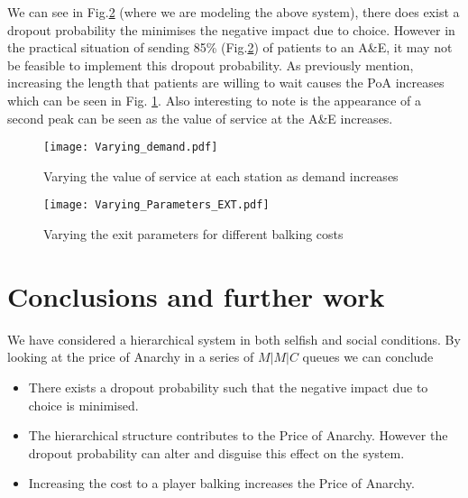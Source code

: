 \documentclass[12pt]{article}
\begin{document}
    We can see in Fig.\ref{fig:EXTparam} (where we are modeling the above system), there does exist a dropout probability the minimises the negative impact due to choice. However in the practical situation of sending 85\% (Fig.\ref{fig:EXTparam}) of patients to an A\&E, it may not be feasible to implement this dropout probability.
   As previously mention, increasing the length that patients are willing to wait causes the PoA increases
 which can be seen in Fig. \ref{fig:Demandparam}. Also interesting to note is the appearance of a second peak can be seen as the value of service at the A\&E increases.

    \begin{figure}[ht]
    	\begin{center}

        	\texttt{[image: Varying\_demand.pdf]}
            \caption{Varying the value of service at each station as demand increases}
            \label{fig:Demandparam}
      \end{center}
	\end{figure}

    \begin{figure}[ht]
    	\begin{center}

        	\texttt{[image: Varying\_Parameters\_EXT.pdf]}
            \caption{Varying the exit parameters for different balking costs}
            \label{fig:EXTparam}
      \end{center}
	\end{figure}


\break




\section{Conclusions and further work}

	We have considered a hierarchical system in both selfish and social conditions. By looking at the price of Anarchy in a series of $M|M|C$ queues we can conclude

    \begin{itemize}
    	\item{There exists a dropout probability such that the negative impact due to choice is minimised. }
        \item{The hierarchical structure contributes to the Price of Anarchy. However the dropout probability can alter and disguise this effect on the system.}
        \item{Increasing the cost to a player balking increases the Price of Anarchy.}
    \end{itemize}
\end{document}
